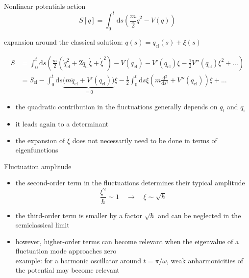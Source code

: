 \documentclass[t,dvipsnames]{beamer}
\begin{document}
\begin{frame}[c]{Nonlinear potentials}
 action
 \begin{displaymath}
  S[q] = \int_0^t\text{d}s\left(\frac{m}{2}\dot q^2 - V(q)\right)
 \end{displaymath}

 \vspace{0.2truecm}
 expansion around the classical solution: $q(s) = q_\text{cl}(s)+\xi(s)$

 \begin{footnotesize}
  \begin{displaymath}
   \begin{aligned}
    S &= \int_0^t\text{d}s\left(\frac{m}{2}(\dot q_\text{cl}^2+2\dot q_\text{cl}\dot\xi+\dot\xi^2)
         -V(q_\text{cl})-V'(q_\text{cl})\xi-\frac{1}{2}V''(q_\text{cl})\xi^2+\ldots\right)\\
      &= S_\text{cl} - \int_0^t\text{d}s\underbrace{\big(m\ddot q_\text{cl}+V'(q_\text{cl})\big)}_{=0}\xi
         -\frac{1}{2}\int_0^t\text{d}s \xi\left(m\frac{\text{d}^2}{\text{d}s^2}+V''(q_\text{cl})\right)\xi
	 + \ldots
   \end{aligned}
  \end{displaymath}
 \end{footnotesize}

 \begin{itemize}
  \item the quadratic contribution in the fluctuations generally depends on $q_\text{f}$ and $q_\text{i}$
  \item it leads again to a determinant
  \item the expansion of $\xi$ does not necessarily need to be done in terms of eigenfunctions 
 \end{itemize}
\end{frame}

\begin{frame}[c]{Fluctuation amplitude}
 \begin{itemize}
  \item the second-order term in the fluctuations determines their typical amplitude
	\begin{displaymath}
         \frac{\xi^2}{\hbar} \sim 1\quad \rightarrow\quad \xi \sim \sqrt{\hbar}
	\end{displaymath}
  \item the third-order term is smaller by a factor $\sqrt{\hbar}$ and can be neglected in the
	semiclassical limit
  \item however, higher-order terms can become relevant when the eigenvalue of a fluctuation
	  mode approaches zero\\[0.1truecm]
	example: for a harmonic oscillator around $t=\pi/\omega$, weak anharmonicities of
		 the potential may become relevant
 \end{itemize}
\end{frame}
\end{document}
